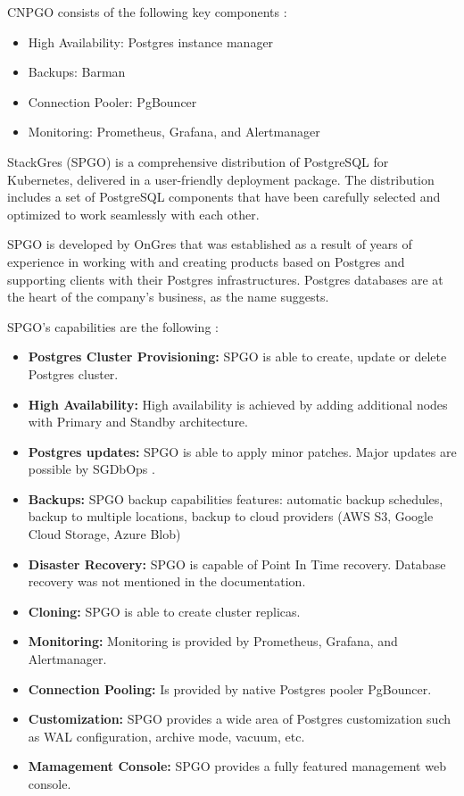 CNPGO consists of the following key components \cite{PostgresOnKubernetes} \cite{CNPGdocuQuickstart}:
\begin{itemize}
  \item High Availability: Postgres instance manager
  \item Backups: Barman
  \item Connection Pooler: PgBouncer
  \item Monitoring: Prometheus, Grafana, and Alertmanager
\end{itemize}


\pagebreak
{}
StackGres (SPGO) is a comprehensive distribution of PostgreSQL for Kubernetes, delivered in a user-friendly deployment package. The distribution includes a set of PostgreSQL components that have been carefully selected and optimized to work seamlessly with each other. \cite{SPGOgitlab}

SPGO is developed by OnGres that was established as a result of years of experience in working with and creating products based on Postgres and supporting clients with their Postgres infrastructures. Postgres databases are at the heart of the company's business, as the name suggests. \cite{OnGres}

SPGO’s capabilities are the following \cite{OnGres}:
\begin{itemize}
  \item \textbf{Postgres Cluster Provisioning:} SPGO is able to create, update or delete Postgres cluster.
  \item \textbf{High Availability:} High availability is achieved by adding additional nodes with Primary and Standby architecture.
  \item \textbf{Postgres updates:} SPGO is able to apply minor patches. Major updates are possible by SGDbOps \cite{SPGODocuMajorUpdates}.
  \item \textbf{Backups:} SPGO backup capabilities features: automatic backup schedules, backup to multiple locations, backup to cloud providers (AWS S3, Google Cloud Storage, Azure Blob)
  \item \textbf{Disaster Recovery:} SPGO is capable of Point In Time recovery. Database recovery was not mentioned in the documentation.
  \item \textbf{Cloning:} SPGO is able to create cluster replicas.
  \item \textbf{Monitoring:} Monitoring is provided by Prometheus, Grafana, and Alertmanager.
  \item \textbf{Connection Pooling:} Is provided by native Postgres pooler PgBouncer.
  \item \textbf{Customization:} SPGO provides a wide area of Postgres customization such as WAL configuration, archive mode, vacuum, etc. \cite{SPGODocuCustomization}
  \item \textbf{Mamagement Console:} SPGO provides a fully featured management web console.

\end{itemize}

